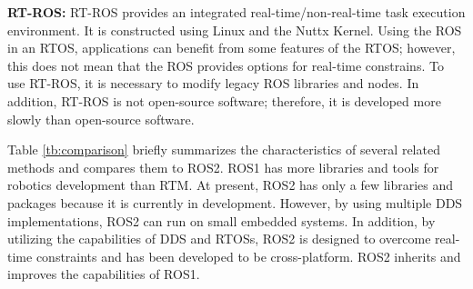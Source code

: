 \documentclass{sig-alternate-05-2015}
\begin{document}
\textbf{RT-ROS:} 
RT-ROS \cite{wei2015rt} provides an integrated real-time/non-real-time task execution environment. 
It is constructed using Linux and the Nuttx Kernel. 
Using the ROS in an RTOS, applications can benefit from some features of the RTOS; however, this does not mean that the ROS provides options for real-time constrains. 
To use RT-ROS, it is necessary to modify legacy ROS libraries and nodes. 
In addition, RT-ROS is not open-source software; therefore, it is developed more slowly than open-source software.

Table \ref{tb:comparison} briefly summarizes the characteristics of several related methods and compares them to ROS2. 
ROS1 has more libraries and tools for robotics development than RTM.
At present, ROS2 has only a few libraries and packages because it is currently in development. 
However, by using multiple DDS implementations, ROS2 can run on small embedded systems. 
In addition, by utilizing the capabilities of DDS and RTOSs, ROS2 is designed to overcome real-time constraints and has been developed to be cross-platform.
ROS2 inherits and improves the capabilities of ROS1.
\end{document}
